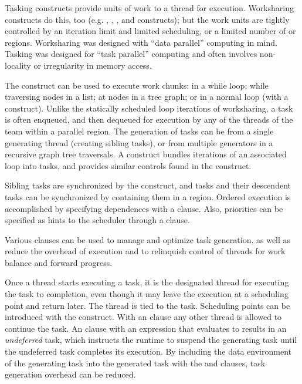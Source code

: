 \label{chap:tasking}

Tasking constructs provide units of work to a thread for execution.  
Worksharing constructs do this, too (e.g. , , 
, and  constructs); 
but the work units are tightly controlled by an iteration limit and limited 
scheduling, or a limited number of  or  regions. 
Worksharing was designed 
with ``data parallel'' computing in mind.  Tasking was designed for 
``task parallel'' computing and often involves non-locality or irregularity 
in memory access.

The  construct can be used to execute work chunks: in a while loop; 
while traversing nodes in a list; at nodes in a tree graph; 
or in a normal loop (with a  construct).  
Unlike the statically scheduled loop iterations of worksharing, a task is 
often enqueued, and then dequeued for execution by any of the threads of the
team within a parallel region. The generation of tasks can be from a single 
generating thread (creating sibling tasks), or from multiple generators
in a recursive graph tree traversals. 
A  construct
bundles iterations of an associated loop into tasks, and provides 
similar controls found in the  construct.

Sibling tasks are synchronized by the  construct, and tasks
and their descendent tasks can be synchronized by containing them in
a  region.  Ordered execution is accomplished by specifying
dependences with a  clause. Also, priorities can be
specified as hints to the scheduler through a  clause.

Various clauses can be used to manage and optimize task generation,
as well as reduce the overhead of execution and to relinquish 
control of threads for work balance and forward progress. 

Once a thread starts executing a task, it is the designated thread 
for executing the task to completion, even though it may leave the
execution at a scheduling point and return later.  The thread is tied
to the task.  Scheduling points can be introduced with the 
construct.  With an  clause any other thread is allowed to continue
the task.  An  clause with an expression that evaluates to  
results in an \emph{undeferred} task, which instructs the runtime to suspend
the generating task until the undeferred task completes its execution.
By including the data environment of the generating task into the generated task with the 
 and  clauses, task generation overhead can be reduced.

